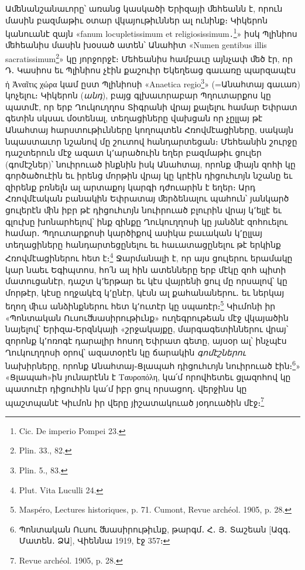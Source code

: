 \documentclass{article}
\begin{document}
{Աﬔնանշանաւորը՝ առանց կասկածի Երիզայի ﬔհեանն է, որուն մասին բազմաթիւ օտար վկայութիւններ ալ ունինք։ Կիկերոն կանուանէ զայն «fanum locupletissimum et religiosissimum․\footnote{Cic. De imperio Pompei 23.}» իսկ Պլինիոս ﬔհեանիս մասին խօսած ատեն՝ Անահիտ «Numen gentibus illis sacratissimum\footnote{Plin. 33., 82.}» կը յորջորջէ։ Մեհեանիս համբաւը այնչափ ﬔծ էր, որ Դ․ Կասիոս եւ Պլինիոս չէին քաշուիր Եկեղեաց գաւառը պարզապէս ἡ Ἀναῖτις χώρα կամ ըստ Պլինիոսի «Anaetica regio\footnote{Plin. 5., 83.}» (=Անահտայ գաւառ) կոչելու։ Կիկերոն (\emph{անդ}), բայց գլխաւորաբար Պղուտարքոս կը պատմէ, որ երբ Ղուկուղղոս Տիգրանի վրայ քալելու համար Եփրատ գետին սկսաւ մօտենալ, տեղացիները վախցան որ չըլլայ թէ Անահտայ հարստութիւնները կողոպտեն Հռովմէացիները, սակայն նպաստաւոր նշանով մը շուտով հանդարտեցան։ Մեհեանին շուրջը դաշտերուն մէջ ազատ կ՚արածուին եղեր բազմաթիւ ցուլեր (գոմէշներ)՝ նուիրուած ինքնին իսկ Անահտայ, որոնք ﬕայն զոհի կը գործածուէին եւ իրենց մորթին վրայ կը կրէին դիցուհւոյն նշանը եւ զիրենք բռնելն ալ արտաքոյ կարգի դժուարին է եղեր։ Արդ Հռովմէական բանակին Եփրատայ ﬔրձենալու պահուն՝ յանկարծ ցուլերէն ﬕն իբր թէ դիցուհւոյն նուիրուած բլուրին վրայ կ՚ելլէ եւ գլուխը խոնարհելով՝ ինք զինքը Ղուկուղղոսի կը յանձնէ զոհուելու համար․ Պղուտարքոսի կարծիքով ասիկա բաւական կ՚ըլլայ տեղացիները հանդարտեցընելու եւ հաւատացընելու թէ երկինք Հռովմէացիներու հետ է։\footnote{Plut. Vita Luculli 24.} Ջարմանալի է, որ այս ցուլերու երամակը կար նաեւ Եգիպտոս, հո՛ն ալ հին ատենները երբ մէկը զոհ պիտի մատուցանէր, դաշտ կ՚երթար եւ կէս վայրենի ցուլ մը որսալով՝ կը մորթէր, կէսը ողջակէզ կ՚ընէր, կէսն ալ քահանաներու․ եւ ներկայ եղող ﬕւս անձինքներու հետ կ՚ուտէր կը սպառէր։\footnote{Maspéro, Lectures historiques, p. 71. Cumont, Revue archéol. 1905, p. 28.} Կիւմոնի իր «Պոնտական Ուսուﬓասիրութիւնք» ուղեգրութեան մէջ վկայածին նայելով՝ Երիզա֊Երզնկայի «շրջակայքը, մարգագետիններու վրայ՝ զորոնք կ՚ոռոգէ դարալիր հոսող Եփրատ գետը, այսօր ալ՝ ինչպէս Ղուկուղղոսի օրով՝ ազատօրէն կը ճարակին \emph{գոմէշներու} նախիրները, որոնք Անահտայ֊Ցլապահ դիցուհւոյն նուիրուած էին։\footnote{Պոնտական Ուսու ﬓասիրութիւնք, թարգմ․ Հ․ Յ․ Տաշեան [Ազգ․ Մատեն․ ՁԱ], Վիեննա 1919, էջ 357։}» «Ցլապահ»ին յունարէնն է Ταυροπόλη, կա՛մ որովհետեւ ցլազոհով կը պատուէր դիցուհին կա՛մ իբր ցուլ որսացող․ վերջինս կը պաշտպանէ Կիւմոն իր վերը յիշատակուած յօդուածին մէջ։\footnote{Revue archéol. 1905, p. 28.}

}
\end{document}
